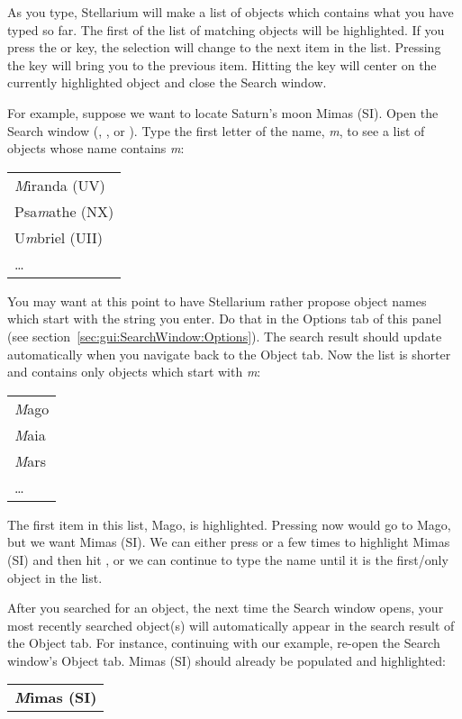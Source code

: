 As you type, Stellarium will make a list of objects which contains 
what you have typed so far. The first of the list of matching objects
will be highlighted. If you press the \key{\tab} or \key{\arrowkeydown} key,
the selection will change to the next item in the list.
Pressing the \key{\arrowkeyup} key will bring you to the previous item.
Hitting the \key{\return} key will center on the
currently highlighted object and close the Search window.

For example, suppose we want to locate Saturn's moon Mimas (SI).
Open the Search window (, , or ).
Type the first letter of the name, \emph{m}, to see a list
of objects whose name contains \emph{m}:
\begin{center}
\begin{tabular}{l}
        \emph{M}iranda (UV)\\
        Psa\emph{m}athe (NX)\\
        U\emph{m}briel (UII)\\
        \ldots\\
\end{tabular}
\end{center}

\noindent You may want at this point to have Stellarium rather propose object
names which start with the string you enter. Do that in the Options tab
of this panel (see section~\ref{sec:gui:SearchWindow:Options}).
The search result should update automatically
when you navigate back to the Object tab.
Now the list is shorter and contains only objects which start
with \emph{m}:
\begin{center}
\begin{tabular}{l}
        \emph{M}ago\\
        \emph{M}aia\\
        \emph{M}ars\\
        \ldots\\
\end{tabular}
\end{center}

\noindent The first item in this list, Mago, is
highlighted. Pressing \key{\return} now would go to Mago, but we want
Mimas (SI). We can either press \key{\tab} or \key{\arrowkeydown} a few times to highlight Mimas (SI)
and then hit \key{\return}, or we can continue to type the name until
it is the first/only object in the list.

After you searched for an object, the next time the Search window opens,
your most recently searched object(s)
will automatically appear in the search result of the Object tab.
For instance, continuing with our example, re-open the Search window's Object tab.
Mimas (SI) should already be populated and highlighted:
\begin{center}
\begin{tabular}{l}
        \textbf{\emph{M}imas (SI)}\\
\end{tabular}
\end{center}

